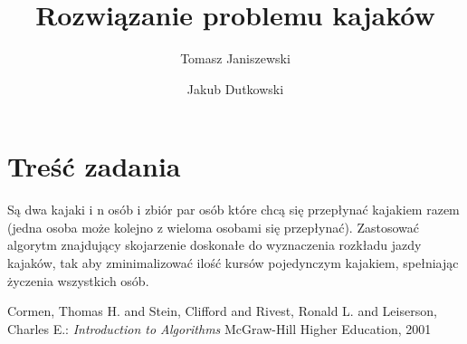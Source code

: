 \documentclass{llncs}
\begin{document}
\title{Rozwiązanie problemu kajaków}
%
%
\author{Tomasz Janiszewski \and Jakub Dutkowski}
%
%


\maketitle              %

%
\section{Treść zadania}
Są dwa kajaki i n osób i zbiór par osób które chcą się
przepłynać kajakiem razem (jedna osoba może kolejno z wieloma osobami się
przepłynać). Zastosować algorytm znajdujący skojarzenie doskonałe do
wyznaczenia rozkładu jazdy kajaków, tak aby zminimalizować ilość kursów
pojedynczym kajakiem, spełniając życzenia wszystkich osób.

%
%
\begin{thebibliography}{4}
%
Cormen, Thomas H. and Stein, Clifford and Rivest, Ronald L. and Leiserson, Charles E.:
\textsl{Introduction to Algorithms}
McGraw-Hill Higher Education, 2001
\end{thebibliography}
\end{document}
